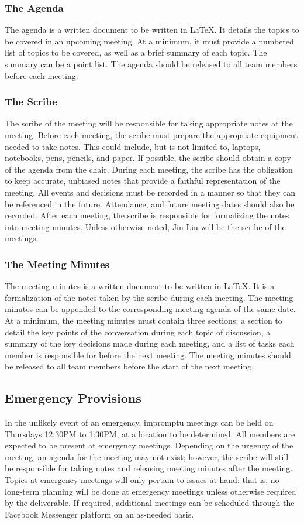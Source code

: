 \documentclass{article}
\begin{document}
\subsubsection{The Agenda}
The agenda is a written document to be written in \LaTeX. It details the topics to be covered in an upcoming meeting. At a minimum, it must provide a numbered list of topics to be covered, as well as a brief summary of each topic. The summary can be a point list. The agenda should be released to all team members before each meeting.

\subsubsection{The Scribe}
The scribe of the meeting will be responsible for taking appropriate notes at the meeting. Before each meeting, the scribe must prepare the appropriate equipment needed to take notes. This could include, but is not limited to, laptops, notebooks, pens, pencils, and paper. If possible, the scribe should obtain a copy of the agenda from the chair. During each meeting, the scribe has the obligation to keep accurate, unbiased notes that provide a faithful representation of the meeting. All events and decisions must be recorded in a manner so that they can be referenced in the future. Attendance, and future meeting dates should also be recorded. After each meeting, the scribe is responsible for formalizing the notes into meeting minutes. Unless otherwise noted, Jin Liu will be the scribe of the meetings.

\subsubsection{The Meeting Minutes}
The meeting minutes is a written document to be written in \LaTeX. It is a formalization of the notes taken by the scribe during each meeting. The meeting minutes can be appended to the corresponding meeting agenda of the same date. At a minimum, the meeting minutes must contain three sections: a section to detail the key points of the conversation during each topic of discussion, a summary of the key decisions made during each meeting, and a list of tasks each member is responsible for before the next meeting. The meeting minutes should be released to all team members before the start of the next meeting.

\subsection{Emergency Provisions}
In the unlikely event of an emergency, impromptu meetings can be held on Thursdays 12:30PM to 1:30PM, at a location to be determined. All members are expected to be present at emergency meetings. Depending on the urgency of the meeting, an agenda for the meeting may not exist; however, the scribe will still be responsible for taking notes and releasing meeting minutes after the meeting. Topics at emergency meetings will only pertain to issues at-hand: that is, no long-term planning will be done at emergency meetings unless otherwise required by the deliverable. If required, additional meetings can be scheduled through the Facebook Messenger platform on an as-needed basis.
\end{document}
